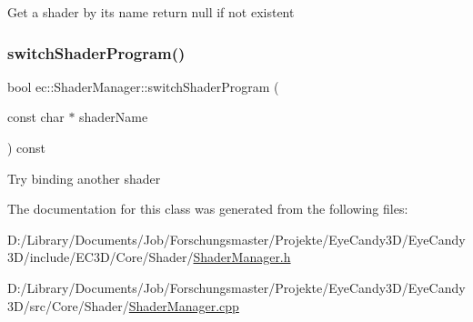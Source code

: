 Get a shader by its name return null if not existent \mbox{\label{classec_1_1_shader_manager_af42171dd2256a130b056d772e3190da0}} 
\subsubsection{\texorpdfstring{switch\+Shader\+Program()}{switchShaderProgram()}}
{\footnotesize\ttfamily bool ec\+::\+Shader\+Manager\+::switch\+Shader\+Program (\begin{DoxyParamCaption}\item[{const char $\ast$}]{shader\+Name }\end{DoxyParamCaption}) const}

Try binding another shader 

The documentation for this class was generated from the following files\+:\begin{DoxyCompactItemize}
\item 
D\+:/\+Library/\+Documents/\+Job/\+Forschungsmaster/\+Projekte/\+Eye\+Candy3\+D/\+Eye\+Candy3\+D/include/\+E\+C3\+D/\+Core/\+Shader/\mbox{\hyperlink{_shader_manager_8h}{Shader\+Manager.\+h}}\item 
D\+:/\+Library/\+Documents/\+Job/\+Forschungsmaster/\+Projekte/\+Eye\+Candy3\+D/\+Eye\+Candy3\+D/src/\+Core/\+Shader/\mbox{\hyperlink{_shader_manager_8cpp}{Shader\+Manager.\+cpp}}\end{DoxyCompactItemize}
